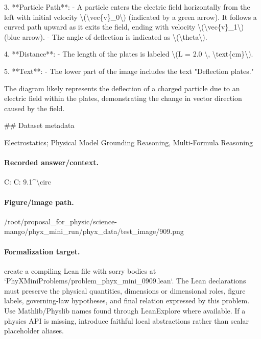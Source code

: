 3. **Particle Path**:
   - A particle enters the electric field horizontally from the left with initial velocity \textbackslash{}(\textbackslash{}vec\{v\}\_0\textbackslash{}) (indicated by a green arrow). It follows a curved path upward as it exits the field, ending with velocity \textbackslash{}(\textbackslash{}vec\{v\}\_1\textbackslash{}) (blue arrow).
   - The angle of deflection is indicated as \textbackslash{}(\textbackslash{}theta\textbackslash{}).

4. **Distance**:
   - The length of the plates is labeled \textbackslash{}(L = 2.0 \textbackslash{}, \textbackslash{}text\{cm\}\textbackslash{}).

5. **Text**:
   - The lower part of the image includes the text "Deflection plates."

The diagram likely represents the deflection of a charged particle due to an electric field within the plates, demonstrating the change in vector direction caused by the field.

\#\# Dataset metadata

Electrostatics; Physical Model Grounding Reasoning, Multi-Formula Reasoning

\paragraph{Recorded answer/context.}
C: C: 9.1\textasciicircum{}\textbackslash{}circ

\paragraph{Figure/image path.}
/root/proposal\_for\_physic/science-mango/phyx\_mini\_run/phyx\_data/test\_image/909.png

\paragraph{Formalization target.}
create a compiling Lean file with sorry bodies at `PhyXMiniProblems/problem\_phyx\_mini\_0909.lean`. The Lean declarations must preserve the physical quantities, dimensions or dimensional roles, figure labels, governing-law hypotheses, and final relation expressed by this problem.
Use Mathlib/Physlib names found through LeanExplore where available. If a physics API is missing, introduce faithful local abstractions rather than scalar placeholder aliases.

